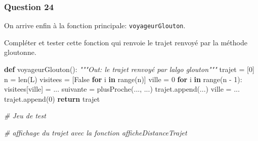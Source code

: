 \documentclass[
  paper=a4,
  ,captions=tableheading
]{scrartcl}
\newenvironment{Shaded}{}{}
\newcommand{\BuiltInTok}[1]{\textcolor[rgb]{0.00,0.50,0.00}{#1}}
\newcommand{\CommentTok}[1]{\textcolor[rgb]{0.38,0.63,0.69}{\textit{#1}}}
\newcommand{\ControlFlowTok}[1]{\textcolor[rgb]{0.00,0.44,0.13}{\textbf{#1}}}
\newcommand{\DecValTok}[1]{\textcolor[rgb]{0.25,0.63,0.44}{#1}}
\newcommand{\KeywordTok}[1]{\textcolor[rgb]{0.00,0.44,0.13}{\textbf{#1}}}
\newcommand{\NormalTok}[1]{#1}
\newcommand{\OperatorTok}[1]{\textcolor[rgb]{0.40,0.40,0.40}{#1}}
\newcommand{\VariableTok}[1]{\textcolor[rgb]{0.10,0.09,0.49}{#1}}
\begin{document}
\hypertarget{question-24}{%
\subsubsection{Question 24}\label{question-24}}

On arrive enfin à la fonction principale: \texttt{voyageurGlouton}.

Compléter et tester cette fonction qui renvoie le trajet renvoyé par la
méthode gloutonne.

\begin{Shaded}
\begin{Highlighting}[]
\KeywordTok{def}\NormalTok{ voyageurGlouton():}
    \CommentTok{"""Out: le trajet renvoyé par l\textquotesingle{}algo glouton"""}
\NormalTok{    trajet }\OperatorTok{=}\NormalTok{ [}\DecValTok{0}\NormalTok{]}
\NormalTok{    n }\OperatorTok{=} \BuiltInTok{len}\NormalTok{(L)}
\NormalTok{    visitees }\OperatorTok{=}\NormalTok{ [}\VariableTok{False} \ControlFlowTok{for}\NormalTok{ i }\KeywordTok{in} \BuiltInTok{range}\NormalTok{(n)]}
\NormalTok{    ville }\OperatorTok{=} \DecValTok{0}
    \ControlFlowTok{for}\NormalTok{ i }\KeywordTok{in} \BuiltInTok{range}\NormalTok{(n }\OperatorTok{{-}} \DecValTok{1}\NormalTok{):}
\NormalTok{        visitees[ville] }\OperatorTok{=}\NormalTok{ ...}
\NormalTok{        suivante }\OperatorTok{=}\NormalTok{ plusProche(..., ...)}
\NormalTok{        trajet.append(...)}
\NormalTok{        ville }\OperatorTok{=}\NormalTok{ ...}
\NormalTok{    trajet.append(}\DecValTok{0}\NormalTok{)}
    \ControlFlowTok{return}\NormalTok{ trajet}
\end{Highlighting}
\end{Shaded}

\begin{Shaded}
\begin{Highlighting}[]
\CommentTok{\# Jeu de test}
\end{Highlighting}
\end{Shaded}

\begin{Shaded}
\begin{Highlighting}[]
\CommentTok{\# affichage du trajet avec la fonction afficheDistanceTrajet}
\end{Highlighting}
\end{Shaded}
\end{document}

